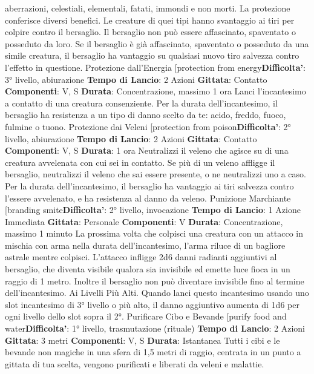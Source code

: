 \begin{multicols}{2}
aberrazioni, celestiali, elementali, fatati, immondi e non
morti.
La protezione conferisce diversi benefici. Le creature di
quei tipi hanno svantaggio ai tiri per colpire contro il
bersaglio. Il bersaglio non può essere affascinato,
spaventato o posseduto da loro. Se il bersaglio è già
affascinato, spaventato o posseduto da una simile
creatura, il bersaglio ha vantaggio su qualsiasi nuovo
tiro salvezza contro l’effetto in questione.
Protezione dall’Energia
[protection from energy\textbf{Difficolta'}:
3° livello, abiurazione
\textbf{Tempo di Lancio}: 2 Azioni
\textbf{Gittata}: Contatto
\textbf{Componenti}: V, S
\textbf{Durata}: Concentrazione, massimo 1 ora
Lanci l’incantesimo a contatto di una creatura
consenziente. Per la durata dell’incantesimo, il
bersaglio ha resistenza a un tipo di danno scelto da te:
acido, freddo, fuoco, fulmine o tuono.
Protezione dai Veleni
[protection from poison\textbf{Difficolta'}:
2° livello, abiurazione
\textbf{Tempo di Lancio}: 2 Azioni
\textbf{Gittata}: Contatto
\textbf{Componenti}: V, S
\textbf{Durata}: 1 ora
Neutralizzi il veleno che agisce su di una creatura
avvelenata con cui sei in contatto. Se più di un veleno
affligge il bersaglio, neutralizzi il veleno che sai essere
presente, o ne neutralizzi uno a caso.
Per la durata dell’incantesimo, il bersaglio ha vantaggio
ai tiri salvezza contro l’essere avvelenato, e ha
resistenza al danno da veleno.
Punizione Marchiante
[branding smite\textbf{Difficolta'}:
2° livello, invocazione
\textbf{Tempo di Lancio}: 1 Azione Immediata
\textbf{Gittata}: Personale
\textbf{Componenti}: V
\textbf{Durata}: Concentrazione, massimo 1 minuto
La prossima volta che colpisci una creatura con un
attacco in mischia con arma nella durata
dell’incantesimo, l’arma riluce di un bagliore astrale
mentre colpisci. L’attacco infligge 2d6 danni radianti
aggiuntivi al bersaglio, che diventa visibile qualora sia
invisibile ed emette luce fioca in un raggio di 1 metro.
Inoltre il bersaglio non può diventare invisibile fino al
termine dell’incantesimo.
Ai Livelli Più Alti. Quando lanci questo incantesimo
usando uno slot incantesimo di 3° livello o più alto, il
danno aggiuntivo aumenta di 1d6 per ogni livello dello
slot sopra il 2°.
Purificare Cibo e Bevande
[purify food and water\textbf{Difficolta'}:
1° livello, trasmutazione (rituale)
\textbf{Tempo di Lancio}: 2 Azioni
\textbf{Gittata}: 3 metri
\textbf{Componenti}: V, S
\textbf{Durata}: Istantanea
Tutti i cibi e le bevande non magiche in una sfera di 1,5
metri di raggio, centrata in un punto a gittata di tua
scelta, vengono purificati e liberati da veleni e malattie.

\end{multicols}
